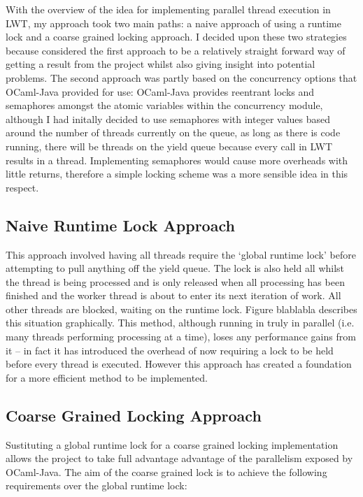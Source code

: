 \documentclass[12pt,twoside,notitlepage]{report}
\begin{document}
With the overview of the idea for implementing parallel thread execution in LWT, my approach took two main paths: a naive approach of using a runtime lock and a coarse grained locking approach. I decided upon these two strategies
because considered the first approach to be a relatively straight forward way of getting a result from the project whilst also giving insight into potential problems. The second approach was partly based on the concurrency options
that OCaml-Java provided for use: OCaml-Java provides reentrant locks and semaphores amongst the atomic variables within the concurrency module, although I had initally decided to use semaphores with integer values based around the
number of threads currently on the queue, as long as there is code running, there will be threads on the yield queue because every call in LWT results in a thread. Implementing semaphores would cause more overheads with little
returns, therefore a simple locking scheme was a more sensible idea in this respect.

\subsection{Naive Runtime Lock Approach}
\label{subsec:naive_runtime_lock_apprach}
%
%
This approach involved having all threads require the `global runtime lock' before attempting to pull anything off the yield queue. The lock is also held all whilst the thread is being processed and is only released when all
processing has been finished and the worker thread is about to enter its next iteration of work. All other threads are blocked, waiting on the runtime lock. Figure blablabla
describes this situation graphically. This method, although running in truly in parallel (i.e. many threads performing processing at a time), loses any performance gains from it -- in fact it has introduced the overhead of now
requiring a lock to be held before every thread is executed.  However this approach has created a foundation for a more efficient method to be implemented.
%
%
\subsection{Coarse Grained Locking Approach}
\label{subsec:coarse_grained_locking_apprach}
%
%
Sustituting a global runtime lock for a coarse grained locking implementation allows the project to take full advantage advantage of the parallelism exposed by OCaml-Java. The aim of the coarse grained lock is
to achieve the following requirements over the global runtime lock:
\end{document}
